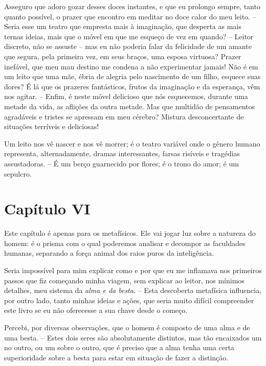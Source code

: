  Asseguro que adoro gozar desses doces instantes, e que eu prolongo
sempre, tanto quanto possível, o prazer que encontro em meditar no doce
calor do meu leito. -- Seria esse um teatro que empresta mais à
imaginação, que desperta as mais ternas ideias, mais que o móvel em que
me esqueço de vez em quando? -- Leitor discreto, não se assuste --
mas eu não poderia falar da felicidade de um amante que segura, pela
primeira vez, em seus braços, uma esposa virtuosa? Prazer inefável, que
meu mau destino me condena a não experimentar jamais! Não é em um leito
que uma mãe, ébria de alegria pelo nascimento de um filho, esquece suas
dores? É lá que os prazeres fantásticos, frutos da imaginação e da
esperança, vêm nos agitar. -- Enfim, é neste móvel delicioso que nós
esquecemos, durante uma metade da vida, as aflições da outra metade.
Mas que multidão de pensamentos agradáveis e tristes se apressam em meu
cérebro? Mistura desconcertante de situações terríveis e deliciosas!

 Um leito nos vê nascer e nos vê morrer; é o teatro variável onde o
gênero humano representa, alternadamente, dramas interessantes, farsas
risíveis e tragédias assustadoras. -- É um berço guarnecido por
flores; é o trono do amor; é um sepulcro.

\section*{Capítulo VI}

 Este capítulo é apenas para os metafísicos. Ele vai jogar luz sobre a
natureza do homem: é o prisma com o qual poderemos analisar e decompor
as faculdades humanas, separando a força animal dos raios puros da
inteligência. 

 Seria impossível para mim explicar como e por que eu me inflamava nos
primeiros passos que fiz começando minha viagem, sem explicar ao
leitor, nos mínimos detalhes, meu sistema da \textit{alma e da besta}.
-- Esta descoberta metafísica influencia, por outro lado, tanto minhas
ideias e ações, que seria muito difícil compreender este livro se eu
não oferecesse a sua chave desde o começo.

 Percebi, por diversas observações, que o homem é composto de uma alma e
de uma besta. -- Estes dois seres são absolutamente distintos, mas tão
encaixados um no outro, ou um sobre o outro, que é preciso que a alma
tenha uma certa superioridade sobre a besta para estar em situação de
fazer a distinção.

